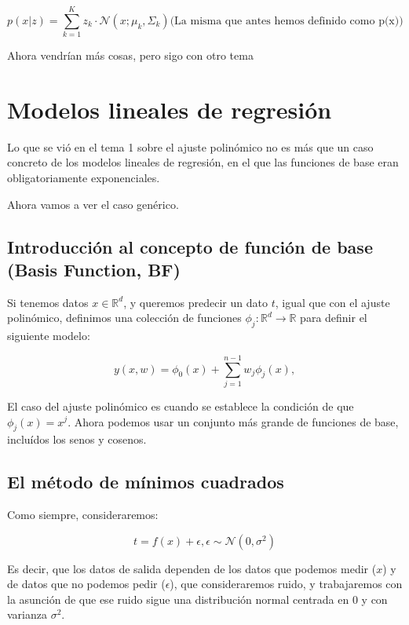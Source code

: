 \documentclass[a4paper,10pt]{article}
\begin{document}
\begin{equation*}
p(x | z) = \sum_{k = 1}^{K} z_k \cdot \mathcal{N}(x; \mu_k, \Sigma_k) \text{(La misma que antes hemos definido como p(x))}
\end{equation*}




Ahora vendrían más cosas, pero sigo con otro tema

\section{Modelos lineales de regresión}
Lo que se vió en el tema 1 sobre el ajuste polinómico no es más que un caso concreto de los modelos lineales de regresión,
en el que las funciones de base eran obligatoriamente exponenciales.

Ahora vamos a ver el caso genérico.

\subsection{Introducción al concepto de función de base (Basis Function, BF)}
Si tenemos datos $x \in \mathbb{R}^d$, y queremos predecir un dato $t$, igual que con el ajuste polinómico, definimos una colección de funciones $\phi_j: \mathbb{R}^d \rightarrow \mathbb{R}$ para definir el siguiente modelo:


\begin{equation*}
y(x,w) = \phi_0(x) + \sum_{j = 1}^{n-1} w_j\phi_j(x),
\end{equation*}

El caso del ajuste polinómico es cuando se establece la condición de que $\phi_j(x) = x^j$. Ahora podemos usar un conjunto
más grande de funciones de base, incluídos los senos y cosenos.

\subsection{El método de mínimos cuadrados}
Como siempre, consideraremos:

\begin{equation*}
t = f(x) + \epsilon, \epsilon \sim \mathcal{N}(0, \sigma^2)
\end{equation*}

Es decir, que los datos de salida dependen de los datos que podemos medir ($x$) y de datos que no podemos pedir ($\epsilon$), que consideraremos ruido, y trabajaremos con la asunción de que ese ruido sigue una distribución normal centrada en $0$ y con varianza $\sigma^2$.
\end{document}
